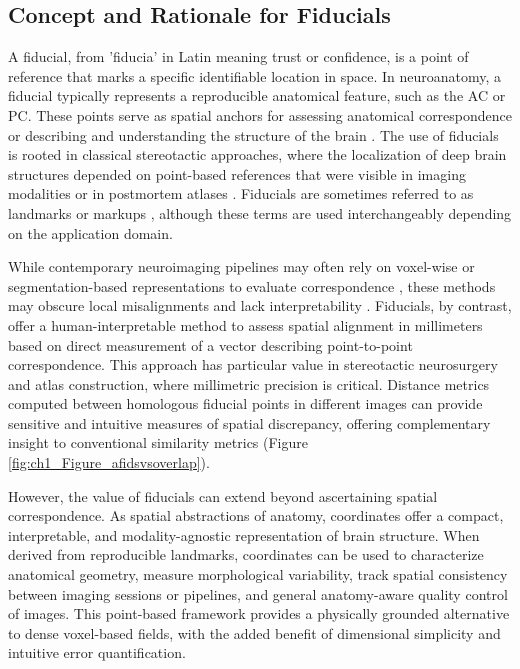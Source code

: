 \subsection{Concept and Rationale for Fiducials}
A fiducial, from 'fiducia' in Latin meaning trust or confidence, is a point of reference that marks a specific identifiable location in space. In neuroanatomy, a fiducial typically represents a reproducible anatomical feature, such as the AC or PC. These points serve as spatial anchors for assessing anatomical correspondence \cite{Schonecker2009-xj,Lau2019-eh} or describing and understanding the structure of the brain \cite{Abbass2022-lf}. The use of fiducials is rooted in classical stereotactic approaches, where the localization of deep brain structures depended on point-based references that were visible in imaging modalities or in postmortem atlases \cite{Schaltenbrand1977-ge, Talalrach1957-bs}. Fiducials are sometimes referred to as landmarks or markups \cite{Fedorov2012-rk}, although these terms are used interchangeably depending on the application domain. 

While contemporary neuroimaging pipelines may often rely on voxel-wise or segmentation-based representations to evaluate correspondence \cite{Chakravarty2008-mt,Hoffmann2024-yd}, these methods may obscure local misalignments \cite{Lau2019-eh} and lack interpretability \cite{Rohlfing2012-kt}. Fiducials, by contrast, offer a human-interpretable method to assess spatial alignment in millimeters based on direct measurement of a vector describing point-to-point correspondence. This approach has particular value in stereotactic neurosurgery and atlas construction, where millimetric precision is critical. Distance metrics computed between homologous fiducial points in different images can provide sensitive and intuitive measures of spatial discrepancy, offering complementary insight to conventional similarity metrics (Figure \ref{fig:ch1_Figure_afidsvsoverlap}).

However, the value of fiducials can extend beyond ascertaining spatial correspondence. As spatial abstractions of anatomy, coordinates offer a compact, interpretable, and modality-agnostic representation of brain structure. When derived from reproducible landmarks, coordinates can be used to characterize anatomical geometry, measure morphological variability, track spatial consistency between imaging sessions or pipelines, and general anatomy-aware quality control of images. This point-based framework provides a physically grounded alternative to dense voxel-based fields, with the added benefit of dimensional simplicity and intuitive error quantification.

